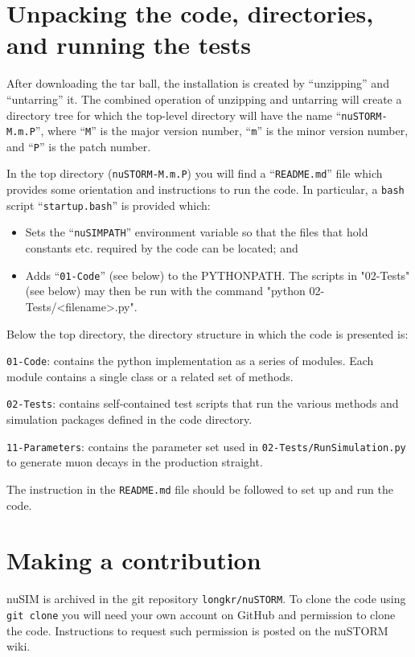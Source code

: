 \section*{Unpacking the code, directories, and running the tests}
After downloading the tar ball, the installation is created by
``unzipping'' and ``untarring'' it.
The combined operation of unzipping and untarring will create a
directory tree for which the top-level directory will have the name
``\verb+nuSTORM-M.m.P+'', where ``\verb+M+'' is the major version
number, ``\verb+m+'' is the minor version number, and ``\verb+P+'' is
the patch number.

In the top directory (\verb+nuSTORM-M.m.P+) you will find a
``\verb+README.md+'' file which provides some orientation and
instructions to run the code.
In particular, a \verb+bash+ script ``\verb+startup.bash+'' is
provided which:
\begin{itemize}
  \item Sets the ``\verb+nuSIMPATH+'' environment variable so that the
    files that hold constants etc. required by the code can be
    located; and
  \item Adds ``\verb+01-Code+'' (see below) to the PYTHONPATH.
    The scripts in "02-Tests" (see below) may then be run with the
    command "python 02-Tests/<filename>.py".
\end{itemize}
Below the top directory, the directory structure in which the code is
presented is:
\begin{description}
  \item\verb+01-Code+: contains the python implementation as a
    series of modules.
    Each module contains a single class or a related set of methods.
  \item\verb+02-Tests+: contains self-contained test scripts that
    run the various methods and simulation packages defined in the
    code directory.
  \item\verb+11-Parameters+: contains the parameter set used in
    \verb+02-Tests/RunSimulation.py+ to generate muon decays in
    the production straight.
\end{description}
The instruction in the \verb+README.md+ file should be followed to set
up and run the code.
  
\section*{Making a contribution}
nuSIM is archived in the git repository \verb+longkr/nuSTORM+.
To clone the code using
\verb+git clone+ you will need your own account on GitHub and
permission to clone the code. 
Instructions to request such permission is posted on the nuSTORM
wiki.
